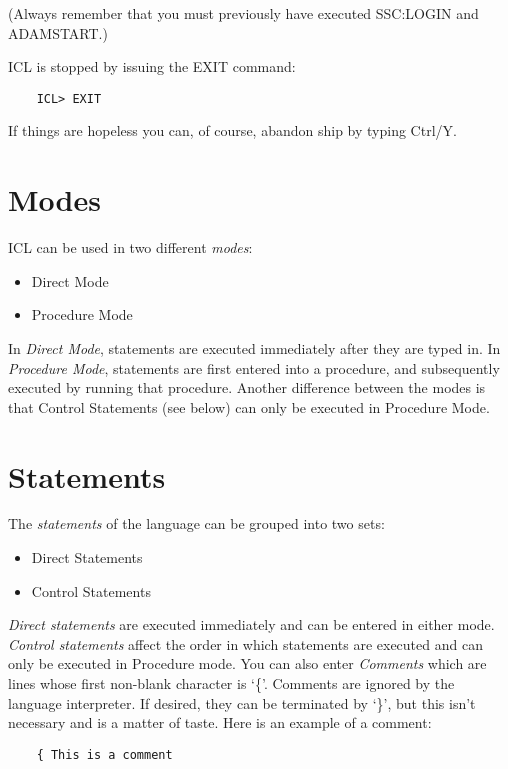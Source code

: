 (Always remember that you must previously have executed SSC:LOGIN and
ADAMSTART.)

ICL is stopped by issuing the EXIT command:

\begin{small}
\begin{verbatim}
    ICL> EXIT
\end{verbatim}
\end{small}

If things are hopeless you can, of course, abandon ship by typing Ctrl/Y.

\section{Modes}
\label{S_modes}

ICL can be used in two different {\em modes}:
\begin{itemize}
\item Direct Mode
\item Procedure Mode
\end{itemize}
In {\em Direct Mode}, statements are executed immediately after they are typed
in.
In {\em Procedure Mode}, statements are first entered into a procedure, and
subsequently executed by running that procedure.
Another difference between the modes is that Control Statements (see below) can
only be executed in Procedure Mode.

\section{Statements}
\label{S_stmnts}

The {\em statements} of the language can be grouped into two sets:
\begin{itemize}
\item Direct Statements
\item Control Statements
\end{itemize}
{\em Direct statements} are executed immediately and can be entered in either
mode.
{\em Control statements} affect the order in which statements are executed
and can only be executed in Procedure mode.
You can also enter {\em Comments} which are lines whose first non-blank
character is `\{'.
Comments are ignored by the language interpreter.
If desired, they can be terminated by `\}', but this isn't necessary and is
a matter of taste.
Here is an example of a comment:

\begin{small}
\begin{verbatim}
    { This is a comment
\end{verbatim}
\end{small}

